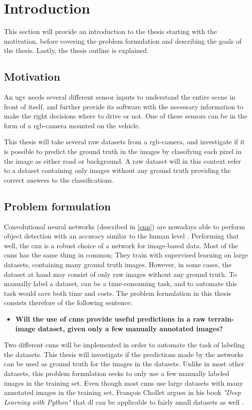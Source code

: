 \documentclass[USenglish]{ifimaster}  %
\begin{document}
\mainmatter{}
\chapter{Introduction}
This section will provide an introduction to the thesis starting with the motivation, before covering the problem formulation and describing the goals of the thesis. Lastly, the thesis outline is explained. 
\section{Motivation}
An \ac{ugv} needs several different sensor inputs to understand the entire scene in front of itself, and further provide its software with the necessary information to make the right decisions where to drive or not. One of these sensors can be in the form of a \ac{rgb}-camera mounted on the vehicle.

This thesis will take several raw datasets from a \ac{rgb}-camera, and investigate if it is possible to predict the ground truth in the images by classifying each pixel in the image as either road or background. A raw dataset will in this context refer to a dataset containing only images without any ground truth providing the correct answers to the classifications.

\section{Problem formulation}
Convolutional neural networks (described in \cref{cnn}) are nowadays able to perform object detection with an accuracy similar to the human level \cite{website:cnn}. Performing that well, the \ac{cnn} is a robust choice of a network for image-based data. Most of the \acp{cnn} has the same thing in common; They train with supervised learning on large datasets, containing many ground truth images. However, in some cases, the dataset at hand may consist of only raw images without any ground truth. To manually label a dataset, can be a time-consuming task, and to automate this task would save both time and costs. The problem formulation in this thesis consists therefore of the following sentence:
\begin{itemize}
\centering
  \item[] \textbf{Will the use of \acp{cnn} provide useful predictions in a raw terrain-image dataset, given only a few manually annotated images?} 
\end{itemize}

Two different \acp{cnn} will be implemented in order to automate the task of labeling the datasets. This thesis will investigate if the predictions made by the networks can be used as ground truth for the images in the datasets. Unlike in most other datasets, this problem formulation seeks to only use a few manually labeled images in the training set. Even though most \acp{cnn} use large datasets with many annotated images in the training set, François Chollet argues in his book \textit{"Deep Learning with Python"} that \ac{dl} can be applicable to fairly small datasets as well \cite{Francois_Deep_learning_with_python}. 
\end{document}
